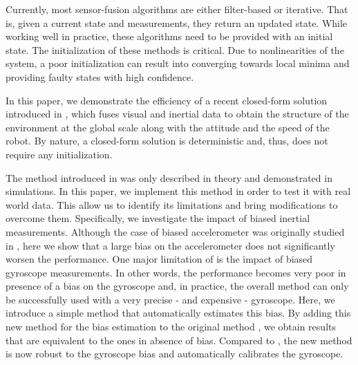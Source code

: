\documentclass[letterpaper, 10 pt, journal, final]{ieeeconf}  %
\begin{document}
Currently, most sensor-fusion algorithms are either filter-based or iterative. That is, given a current state and measurements, they return an updated state.
While working well in practice, these algorithms need to be provided with an initial state.
The initialization of these methods is critical.
Due to nonlinearities of the system, a poor initialization can result into converging towards local minima and  providing faulty states with high confidence.

In this paper, we demonstrate the efficiency of a recent closed-form solution introduced in \cite{Martinelli2012}\cite{Martinelli2014}, which fuses visual and inertial data to obtain the structure of the environment at the global scale along with the attitude and the speed of the robot.
By nature, a closed-form solution is deterministic and, thus, does not require any initialization.


The method introduced in \cite{Martinelli2012}\cite{Martinelli2014} was only described in theory and demonstrated in simulations.
In this paper, we implement this method in order to test it with real world data.
This allow us to identify its limitations and bring modifications to overcome them.
Specifically, we investigate the impact of biased inertial measurements.
Although the case of biased accelerometer was originally studied in \cite{Martinelli2014}, here we show that a large bias on the accelerometer does not significantly worsen the performance.
One major limitation of \cite{Martinelli2014} is the impact of biased gyroscope measurements.
In other words, the performance becomes very poor in presence of a bias on the gyroscope and, in practice, the overall method can only be successfully used with a very precise - and expensive - gyroscope.
Here, we introduce a simple method that automatically estimates this bias. By adding this new method for the bias estimation to the original method \cite{Martinelli2014}, we obtain results that are equivalent to the ones in absence of bias.
Compared to \cite{Martinelli2014}, the new method is now robust to the gyroscope bias and automatically calibrates the gyroscope.
\end{document}
